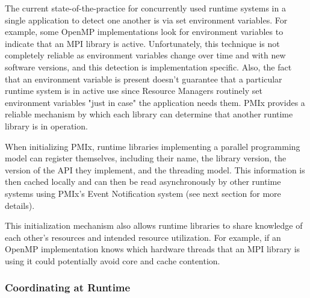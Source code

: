 The current state-of-the-practice for concurrently used runtime systems in a single application to detect one another is via set environment variables.  For example, some OpenMP implementations look for environment variables to indicate that an MPI library is active.  Unfortunately, this technique is not completely reliable as environment variables change over time and with new software versions, and this detection is implementation specific.  Also, the fact that an environment variable is present doesn't guarantee that a particular runtime system is in active use since Resource Managers routinely set environment variables "just in case" the application needs them. PMIx provides a reliable mechanism by which each library can determine that another runtime library is in operation.

When initializing PMIx, runtime libraries implementing a parallel programming model can register themselves, including their name, the library version, the version of the API they implement, and the threading model.  This information is then cached locally and can then be read asynchronously by other runtime systems using PMIx's Event Notification system (see next section for more details).

This initialization mechanism also allows runtime libraries to share knowledge of each other's resources and intended resource utilization. For example, if an OpenMP implementation knows which hardware threads that an MPI library is using it could potentially avoid core and cache contention.




{\large {}}



\subsubsection{Coordinating at Runtime}

